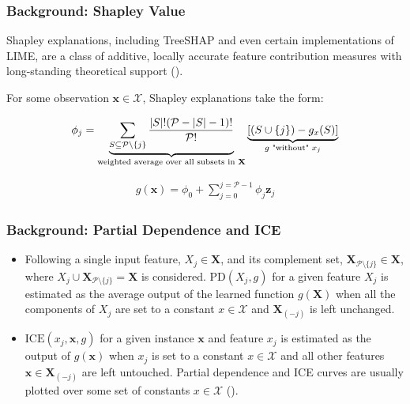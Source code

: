 \documentclass[11pt,aspectratio=169,hyperref={colorlinks}]{beamer}
\begin{document}
\begin{frame}[allowframebreaks]
		\end{frame}

		\begin{frame}
		
			\frametitle{Background: Shapley Value}	
			
			Shapley explanations, including TreeSHAP and even certain implementations of LIME, are a class of additive, locally accurate feature contribution measures with long-standing theoretical support (\cite{shapley}). 

			\vspace{8pt}
			
			For some observation $\mathbf{x} \in \mathcal{X}$, Shapley explanations take the form:
			
			\begin{equation}
				\label{eq:shap_contrib}
				\begin{aligned}
					\phi_{j} = \underbrace{\sum_{S \subseteq \mathcal{P} \setminus \{j\}}\frac{|S|!(\mathcal{P} -|S| -1)!}{\mathcal{P}!}}_\text{weighted average over all subsets in \textbf{X}}\underbrace{[(S \cup \{j\}) - g_x(S)]}_{g\text{ "without" }x_j}
				\end{aligned}
			\end{equation}
			
			\begin{equation}
				\label{eq:shap_additive}
				\begin{aligned}
					g(\mathbf{x}) = \phi_0 + \sum_{j=0}^{j=\mathcal{P} - 1} \phi_j \mathbf{z}_j
				\end{aligned}
			\end{equation}
			
		\end{frame}
		
		\begin{frame}
		
			\frametitle{Background: Partial Dependence and ICE}			

			\begin{itemize}

			\item Following \citet{esl} a single input feature, $X_j \in \mathbf{X}$, and its complement set, $\mathbf{X}_{\mathcal{P} \setminus \{j\}} \in \mathbf{X}$, where $X_j \cup \mathbf{X}_{\mathcal{P} \setminus \{j\}} = \mathbf{X}$ is considered. $\text{PD}(X_j, g)$ for a given feature $X_j$ is estimated as the average output of the learned function $g(\mathbf{X})$ when all the components of $X_j$ are set to a constant $x \in \mathcal{X}$ and $\mathbf{X}_{(-j)}$ is left unchanged.

			\item $\text{ICE}(x_j, \mathbf{x}, g)$ for a given instance $\mathbf{x}$ and feature $x_j$ is estimated as the output of $g(\mathbf{x})$ when $x_j$ is set to a constant $x \in \mathcal{X}$ and all other features $\mathbf{x} \in \mathbf{X}_{(-j)}$ are left untouched. Partial dependence and ICE curves are usually plotted over some set of constants $x \in \mathcal{X}$ (\cite{ice_plots}). 

			\end{itemize} 			
					
		\end{frame}		
		
\end{document}
